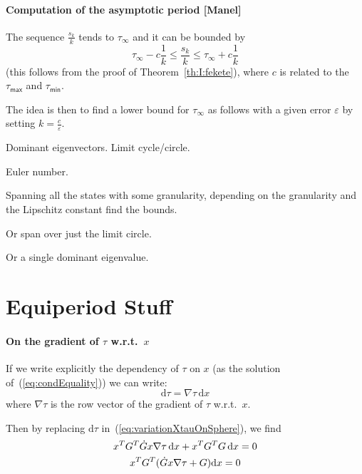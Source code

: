 \documentclass[12pt,draftcls,onecolumn]{IEEEtran} %
\newcommand{\ud}{\mathrm{d}}
\begin{document}
\paragraph{Computation of the asymptotic period [Manel]}

The sequence $\frac{s_k}k$ tends to $\tau_\infty$ and it can be
bounded by
\[
\tau_\infty-c\frac 1k\leq\frac{s_k}k\leq\tau_\infty+c\frac 1k
\]
(this follows from the proof of Theorem~\ref{th:I:fekete}), where $c$
is related to the $\tau_\mathsf{max}$ and $\tau_\mathsf{min}$.

The idea is then to find a lower bound for $\tau_\infty$ as follows
with a given error $\varepsilon$ by setting $k=\frac c\varepsilon$.


Dominant eigenvectors. Limit cycle/circle.

Euler number. 



Spanning all the states with some granularity, depending on the
granularity and the Lipschitz constant find the bounds.

Or span over just the limit circle. 

Or a single dominant eigenvalue.


\section{Equiperiod Stuff}
\label{sec:equiP}





\paragraph{On the gradient of $\tau$ w.r.t.\ $x$}

If we write explicitly the dependency of $\tau$ on $x$ (as the
solution of~(\ref{eq:condEquality})) we can write:
\begin{equation}
  \label{eq:dTau}
  \ud\tau = \nabla\tau\,\ud x
\end{equation}
where $\nabla\tau$ is the row vector of the gradient of $\tau$ w.r.t.\
$x$.

Then by replacing $\ud\tau$ in~(\ref{eq:variationXtauOnSphere}), we
find
\begin{gather}
  x^TG^T\dot Gx\nabla\tau\,\ud x+ x^TG^TG\,\ud x=0 \notag\\
  x^TG^T(\dot Gx\nabla\tau+ G)\ud x=0  
  \label{eq:towardGradTau}
\end{gather}
\end{document}
